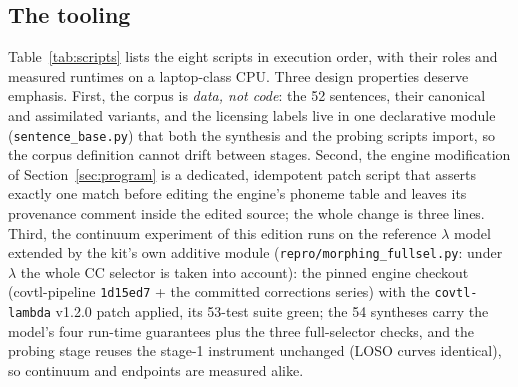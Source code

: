 \documentclass[11pt,a4paper]{article}
\newcommand{\sampa}[1]{\texttt{#1}}
\newcommand{\lam}{\lambda}
\begin{document}
\subsection{The tooling}

Table~\ref{tab:scripts} lists the eight scripts in execution order,
with their roles and measured runtimes on a laptop-class CPU. Three
design properties deserve emphasis. First, the corpus is \emph{data,
not code}: the 52 sentences, their canonical and assimilated
variants, and the licensing labels live in one declarative module
(\sampa{sentence\_base.py}) that both the synthesis and the probing
scripts import, so the corpus definition cannot drift between stages.
Second, the engine modification of Section~\ref{sec:program} is a
dedicated, idempotent patch script that asserts exactly one match
before editing the engine's phoneme table and leaves its provenance
comment inside the edited source; the whole change is three lines.
Third, the continuum experiment of this edition runs on the reference
$\lam$ model extended by the kit's own additive module
(\sampa{repro/morphing\_fullsel.py}: under $\lam$ the whole CC
selector is taken into account): the pinned engine checkout
(covtl-pipeline \texttt{1d15ed7} + the committed corrections series)
with the \texttt{covtl-lambda} v1.2.0 patch applied, its 53-test
suite green; the 54 syntheses carry the model's four run-time
guarantees plus the three full-selector checks, and the
probing stage reuses the stage-1 instrument unchanged (LOSO curves
identical), so continuum and endpoints are measured alike.
\end{document}
